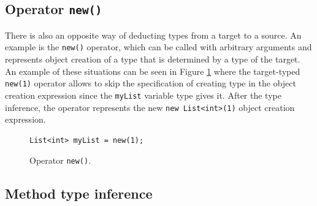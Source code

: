 \subsection{Operator \texttt{new()}}

There is also an opposite way of deducting types from a target to a source.
An example is the \texttt{new()} operator, which can be called with arbitrary arguments and represents object creation of a type that is determined by a type of the target. 
An example of these situations can be seen in Figure \ref{img08:new} where the target-typed \texttt{new(1)} operator allows to skip the specification of creating type in the object creation expression since the \texttt{myList} variable type gives it. After the type inference, the operator represents the new \texttt{new List<int>(1)} object creation expression.
\begin{figure}[h]
\begin{lstlisting}[style=csharp]
List<int> myList = new(1);
\end{lstlisting}
\caption{Operator \texttt{new()}.}
\label{img08:new}
\end{figure}

\subsection{Method type inference} \label{sect05:mti}

